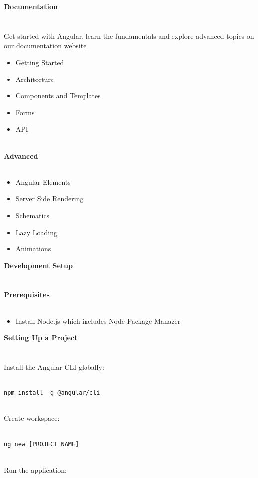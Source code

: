 \documentclass{article}
\begin{document}
{\noindent \LARGE \textbf{Documentation}}\\\\
\\
Get started with Angular, learn the fundamentals and explore advanced topics on our documentation website.\\
\begin{itemize}
	\item Getting Started
	\item Architecture
	\item Components and Templates
	\item Forms
	\item API
\end{itemize}
\\
{\noindent \Large \textbf{Advanced}}\\\\
\begin{itemize}
	\item Angular Elements
	\item Server Side Rendering
	\item Schematics
	\item Lazy Loading
	\item Animations
\end{itemize}
{\noindent \LARGE \textbf{Development Setup}}\\\\
\\
{\noindent \Large \textbf{Prerequisites}}\\\\
\begin{itemize}
	\item Install Node.js which includes Node Package Manager
\end{itemize}
{\noindent \Large \textbf{Setting Up a Project}}\\\\
\\
Install the Angular CLI globally:\\
\\
\begin{lstlisting}
npm install -g @angular/cli
\end{lstlisting}
\\
Create workspace:\\
\\
\begin{lstlisting}
ng new [PROJECT NAME]
\end{lstlisting}
\\
Run the application:\\
\end{document}
